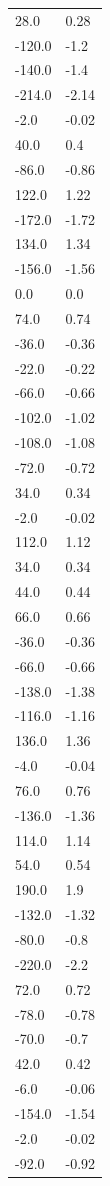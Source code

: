 \begin{longtable}{ll}
28.0 & 0.28 \\
-120.0 & -1.2 \\
-140.0 & -1.4 \\
-214.0 & -2.14 \\
-2.0 & -0.02 \\
40.0 & 0.4 \\
-86.0 & -0.86 \\
122.0 & 1.22 \\
-172.0 & -1.72 \\
134.0 & 1.34 \\
-156.0 & -1.56 \\
0.0 & 0.0 \\
74.0 & 0.74 \\
-36.0 & -0.36 \\
-22.0 & -0.22 \\
-66.0 & -0.66 \\
-102.0 & -1.02 \\
-108.0 & -1.08 \\
-72.0 & -0.72 \\
34.0 & 0.34 \\
-2.0 & -0.02 \\
112.0 & 1.12 \\
34.0 & 0.34 \\
44.0 & 0.44 \\
66.0 & 0.66 \\
-36.0 & -0.36 \\
-66.0 & -0.66 \\
-138.0 & -1.38 \\
-116.0 & -1.16 \\
136.0 & 1.36 \\
-4.0 & -0.04 \\
76.0 & 0.76 \\
-136.0 & -1.36 \\
114.0 & 1.14 \\
54.0 & 0.54 \\
190.0 & 1.9 \\
-132.0 & -1.32 \\
-80.0 & -0.8 \\
-220.0 & -2.2 \\
72.0 & 0.72 \\
-78.0 & -0.78 \\
-70.0 & -0.7 \\
42.0 & 0.42 \\
-6.0 & -0.06 \\
-154.0 & -1.54 \\
-2.0 & -0.02 \\
-92.0 & -0.92 \\

\end{longtable}
